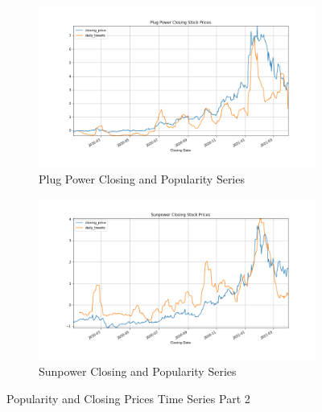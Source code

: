 \documentclass[sigconf, nonacm]{acmart}
\begin{document}
\begin{figure}[H]
\centering
   \begin{subfigure}[b]{0.5\textwidth}
   \includegraphics[width=\textwidth]{popularity_time_series/Plug Power Closing Stock Prices_closing_price_daily_tweets.png} 
   \caption{Plug Power Closing and Popularity Series}
   \label{fig:Ng1} 
\end{subfigure}
\centering
   \begin{subfigure}[b]{0.5\textwidth}
   \includegraphics[width=\textwidth]{popularity_time_series/Sunpower Closing Stock Prices_closing_price_daily_tweets.png} 
   \caption{Sunpower Closing and Popularity Series}
   \label{fig:Ng1} 
\end{subfigure}
\caption{Popularity and Closing Prices Time Series Part 2}
\end{figure}


\end{document}
